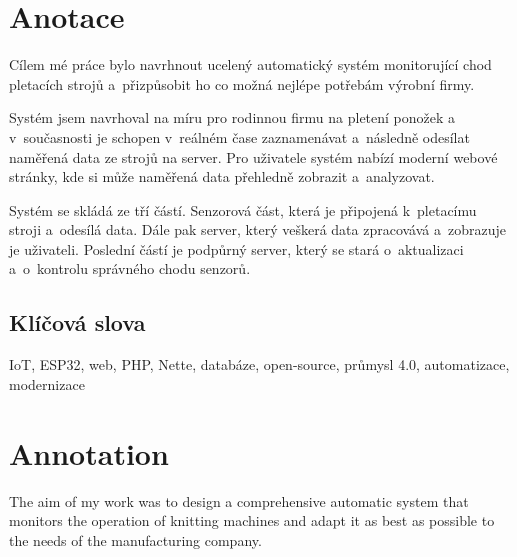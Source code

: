 \documentclass{template/socthesis}
\author{Jakub Andrýsek} %
\begin{document}

\maketitle %



\pagestyle{empty}

\section*{Anotace}
Cílem mé práce bylo navrhnout ucelený automatický systém monitorující chod pletacích strojů a~přizpůsobit ho co možná nejlépe potřebám výrobní firmy.

Systém jsem navrhoval na míru pro rodinnou firmu na pletení ponožek a v současnosti je schopen v~reálném čase zaznamenávat a~následně odesílat naměřená data ze strojů na server. 
Pro uživatele systém nabízí moderní webové stránky, kde si může naměřená data přehledně zobrazit a~analyzovat.

Systém se skládá ze tří částí. Senzorová část, která je připojená k~pletacímu stroji a~odesílá data.
Dále pak server, který veškerá data zpracovává a~zobrazuje je uživateli.
Poslední částí je podpůrný server, který se stará o~aktualizaci a~o~kontrolu správného chodu senzorů.

\subsection*{Klíčová slova}
IoT, ESP32, web, PHP, Nette, databáze, open-source, průmysl 4.0, automatizace, modernizace


\newpage %

\vspace{20mm}

\section*{Annotation}
The aim of my work was to design a comprehensive automatic system that monitors the operation of knitting machines and adapt it as best as possible to the needs of the manufacturing company.
\end{document}
